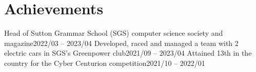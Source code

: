 \documentclass[letterpaper,11pt]{article}
\begin{document}
\section{Achievements}
 \resumeAchievementsListStart
    \resumeAchievements
      {Head of Sutton Grammar School (SGS) computer science society and magazine}{2022/03 -- 2023/04}
    \resumeAchievements
      {Developed, raced and managed a team with 2 electric cars in SGS's Greenpower club}{2021/09 -- 2023/04}
    \resumeAchievements
      {Attained 13th in the country for the Cyber Centurion competition}{2021/10 -- 2022/01}
 \resumeAchievementsListEnd


\end{document}
